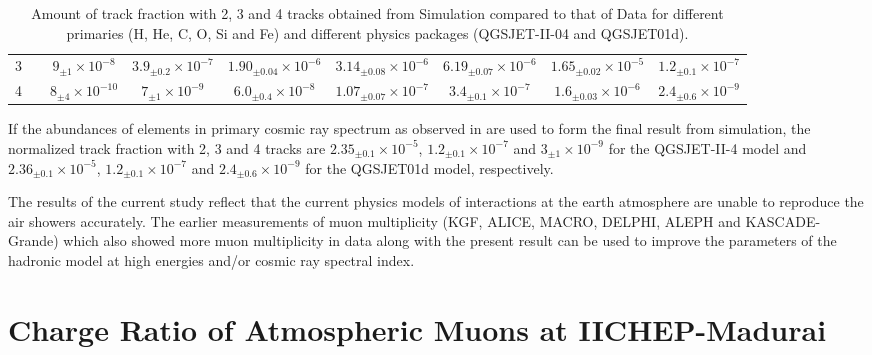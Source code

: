 \documentclass[a4paper,12pt,twoside]{article}
\begin{document}
\begin{table}[]
{\begin{tabular}{cc|cccccc|c|}
\multicolumn{1}{|c|}{3}                                                      &                                                                   & $9_{\pm1}\times 10^{-8}$      & $3.9_{\pm0.2}\times 10^{-7}$ & $1.90_{\pm0.04}\times 10^{-6}$ & $3.14_{\pm0.08}\times 10^{-6}$ & $6.19_{\pm0.07}\times 10^{-6}$ & $1.65_{\pm0.02}\times 10^{-5}$ & $1.2_{\pm0.1}\times 10^{-7}$                                                                                                \\
\multicolumn{1}{|c|}{4}                                                      &                                                                   & $8_{\pm4}\times 10^{-10}$     & $7_{\pm1}\times 10^{-9}$     & $6.0_{\pm0.4}\times 10^{-8}$   & $1.07_{\pm0.07}\times 10^{-7}$ & $3.4_{\pm0.1}\times 10^{-7}$   & $1.6_{\pm0.03}\times 10^{-6}$  & $2.4_{\pm0.6}\times 10^{-9}$                                                                                                \\ \hline
\end{tabular}}
  \caption{Amount of track fraction with 2, 3 and 4 tracks obtained from Simulation compared to that of Data for different primaries (H, He, C, O, Si and Fe) and different physics packages (QGSJET-II-04 and QGSJET01d).}\label{tab:ratio}
\end{table}

If the abundances of elements in primary cosmic ray spectrum as observed in \cite{cosmic1} are used to form the final result from simulation, the normalized track fraction with 2, 3 and 4 tracks are $2.35_{\pm0.1}\times 10^{-5}$, $1.2_{\pm0.1}\times 10^{-7}$ and $3_{\pm1}\times 10^{-9}$ for the QGSJET-II-4 model and $2.36_{\pm0.1}\times 10^{-5}$, $1.2_{\pm0.1}\times 10^{-7}$ and $2.4_{\pm0.6}\times 10^{-9}$ for the QGSJET01d model, respectively.

The results of the current study reflect that the current physics models of interactions at the earth atmosphere are unable to reproduce the air showers accurately. The earlier measurements of muon multiplicity (KGF\cite{kgf1}, ALICE\cite{alice1}, MACRO\cite{macro1}, DELPHI\cite{delphi1}, ALEPH\cite{aleph1} and KASCADE-Grande\cite{kascade1}) which also showed more muon multiplicity in data along with the present result can be used to improve the parameters of the hadronic model at high energies and/or cosmic ray spectral index.

\section{Charge Ratio of Atmospheric Muons at IICHEP-Madurai}
\end{document}
